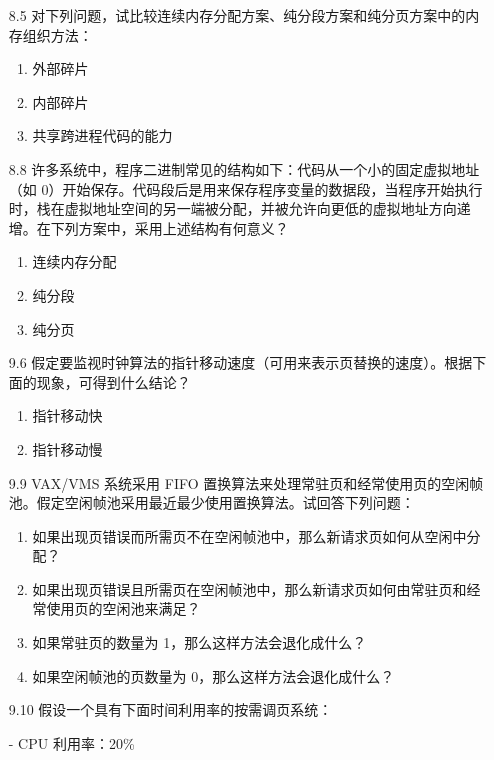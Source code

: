 \documentclass[UTF8]{ctexart}
\begin{document}
\begin{enumerate}
\begin{enumerate}
		\item[8.5] 对下列问题，试比较连续内存分配方案、纯分段方案和纯分页方案中的内存组织方法：
		\begin{enumerate}
			\item 外部碎片
			\item 内部碎片
			\item 共享跨进程代码的能力
		\end{enumerate}
		
		\item[8.8] 许多系统中，程序二进制常见的结构如下：代码从一个小的固定虚拟地址（如 0）开始保存。代码段后是用来保存程序变量的数据段，当程序开始执行时，栈在虚拟地址空间的另一端被分配，并被允许向更低的虚拟地址方向递增。在下列方案中，采用上述结构有何意义？
		\begin{enumerate}
			\item 连续内存分配
			\item 纯分段
			\item 纯分页
		\end{enumerate}
	\end{enumerate}
	
	\begin{enumerate}
		\item[9.6] 假定要监视时钟算法的指针移动速度（可用来表示页替换的速度）。根据下面的现象，可得到什么结论？
		\begin{enumerate}
			\item 指针移动快
			\item 指针移动慢
		\end{enumerate}
		
		\item[9.9] VAX/VMS 系统采用 FIFO 置换算法来处理常驻页和经常使用页的空闲帧池。假定空闲帧池采用最近最少使用置换算法。试回答下列问题：
		\begin{enumerate}
			\item 如果出现页错误而所需页不在空闲帧池中，那么新请求页如何从空闲中分配？
			\item 如果出现页错误且所需页在空闲帧池中，那么新请求页如何由常驻页和经常使用页的空闲池来满足？
			\item 如果常驻页的数量为 1，那么这样方法会退化成什么？
			\item 如果空闲帧池的页数量为 0，那么这样方法会退化成什么？
		\end{enumerate}
		
		\item[9.10] 假设一个具有下面时间利用率的按需调页系统：
		
		
		- CPU 利用率：20\%
		

\end{enumerate}
\end{enumerate}
\end{document}
